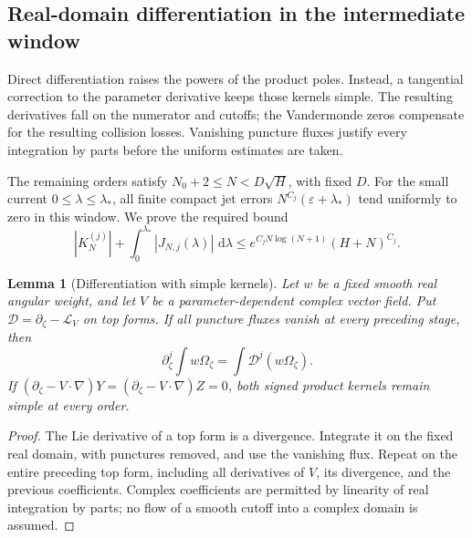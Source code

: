 \documentclass[11pt]{article}
\numberwithin{equation}{section}
\newtheorem{lemma}[theorem]{Lemma}
\theoremstyle{definition}
\newcommand{\dd}{\,\mathrm d}
\newcommand{\eps}{\varepsilon}
\begin{document}
\subsection{Real-domain differentiation in the intermediate window}
\label{iso:lie-section}

Direct differentiation raises the powers of the product poles.
Instead, a tangential correction to the parameter derivative keeps
those kernels simple. The resulting derivatives fall on the
numerator and cutoffs; the Vandermonde zeros compensate for the
resulting collision losses. Vanishing puncture fluxes justify every
integration by parts before the uniform estimates are taken.

The remaining orders satisfy $N_0+2\le N<D\sqrt H$, with fixed $D$.
For the small current $0\le\lambda\le\lambda_*$, all finite compact
jet errors $N^{C_j}(\eps+\lambda_*)$ tend uniformly to zero in this
window. We prove the required bound
\begin{equation}
 |K_N^{(j)}|+\int_0^{\lambda_*}|J_{N,j}(\lambda)|\,\dd\lambda
 \le e^{C_jN\log(N+1)}(H+N)^{C_j}.
 \label{iso:middle-bound}
\end{equation}

\begin{lemma}[Differentiation with simple kernels]\label{iso:lie}
Let $w$ be a fixed smooth real angular weight, and let $V$ be a
parameter-dependent complex vector field. Put
$\mathcal D=\partial_\zeta-\mathcal L_V$ on top forms. If all
puncture fluxes vanish at every preceding stage, then
\[
 \partial_\zeta^j\int w\Omega_\zeta
 =\int\mathcal D^j(w\Omega_\zeta).
\]
If $(\partial_\zeta-V\cdot\nabla)Y=
(\partial_\zeta-V\cdot\nabla)Z=0$, both signed product kernels
remain simple at every order.
\end{lemma}
\begin{proof}
The Lie derivative of a top form is a divergence. Integrate it on the
fixed real domain, with punctures removed, and use the vanishing flux.
Repeat on the entire preceding top form, including all derivatives of
$V$, its divergence, and the previous coefficients. Complex coefficients
are permitted by linearity of real integration by parts; no flow of a
smooth cutoff into a complex domain is assumed.
\end{proof}
\end{document}
